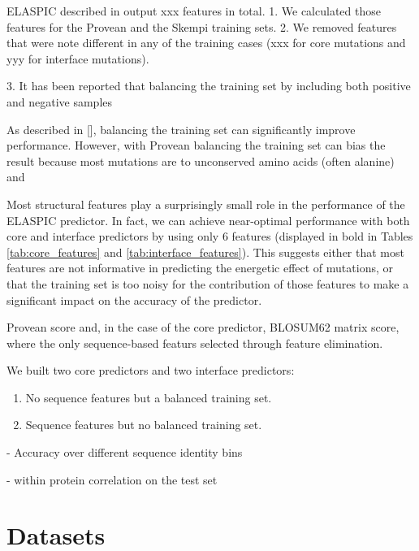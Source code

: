 ELASPIC described in output xxx features in total.
1. We calculated those features for the Provean and the Skempi training sets.
2. We removed features that were note different in any of the training cases (xxx for core mutations and yyy for interface mutations).


3. It has been reported that balancing the training set by including both positive and negative samples


As described in [], balancing the training set can significantly improve performance. However, with Provean balancing the training set can bias the result because most mutations are to unconserved amino acids (often alanine) and


Most structural features play a surprisingly small role in the performance of the ELASPIC predictor. In fact, we can achieve near-optimal performance with both core and interface predictors by using only 6 features (displayed in bold in Tables \ref{tab:core_features} and \ref{tab:interface_features}). This suggests either that most features are not informative in predicting the energetic effect of mutations, or that the training set is too noisy for the contribution of those features to make a significant impact on the accuracy of the predictor.

Provean score and, in the case of the core predictor, BLOSUM62 matrix score, where the only sequence-based featurs selected through feature elimination.

We built two core predictors and two interface predictors:

\begin{enumerate}
	\item No sequence features but a balanced training set.
	\item Sequence features but no balanced training set.
\end{enumerate}

- Accuracy over different sequence identity bins

- within protein correlation on the test set



\section{Datasets}






